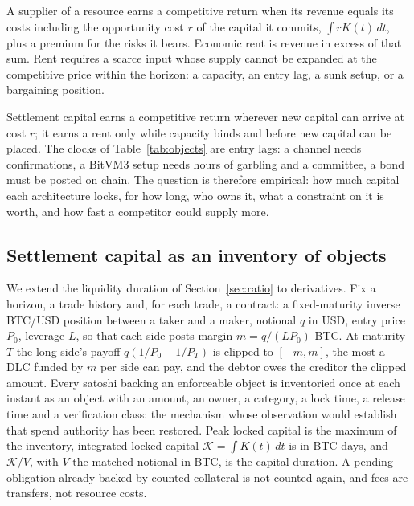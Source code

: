 \begin{definition}
A supplier of a resource earns a competitive return when its revenue equals its costs including the opportunity cost $r$ of the capital it commits, $\int r K(t)\,dt$, plus a premium for the risks it bears. Economic rent is revenue in excess of that sum. Rent requires a scarce input whose supply cannot be expanded at the competitive price within the horizon: a capacity, an entry lag, a sunk setup, or a bargaining position.
\end{definition}

Settlement capital earns a competitive return wherever new capital can arrive at cost $r$; it earns a rent only while capacity binds and before new capital can be placed. The clocks of Table~\ref{tab:objects} are entry lags: a channel needs confirmations, a BitVM3 setup needs hours of garbling and a committee, a bond must be posted on chain. The question is therefore empirical: how much capital each architecture locks, for how long, who owns it, what a constraint on it is worth, and how fast a competitor could supply more.

\subsection{Settlement capital as an inventory of objects}
\label{sec:rent-inventory}

We extend the liquidity duration of Section~\ref{sec:ratio} to derivatives. Fix a horizon, a trade history and, for each trade, a contract: a fixed-maturity inverse BTC/USD position between a taker and a maker, notional $q$ in USD, entry price $P_0$, leverage $L$, so that each side posts margin $m=q/(LP_0)$ BTC. At maturity $T$ the long side's payoff $q(1/P_0-1/P_T)$ is clipped to $[-m,m]$, the most a DLC funded by $m$ per side can pay, and the debtor owes the creditor the clipped amount. Every satoshi backing an enforceable object is inventoried once at each instant as an object with an amount, an owner, a category, a lock time, a release time and a verification class: the mechanism whose observation would establish that spend authority has been restored. Peak locked capital is the maximum of the inventory, integrated locked capital $\mathcal K=\int K(t)\,dt$ is in BTC-days, and $\mathcal K/V$, with $V$ the matched notional in BTC, is the capital duration. A pending obligation already backed by counted collateral is not counted again, and fees are transfers, not resource costs.


